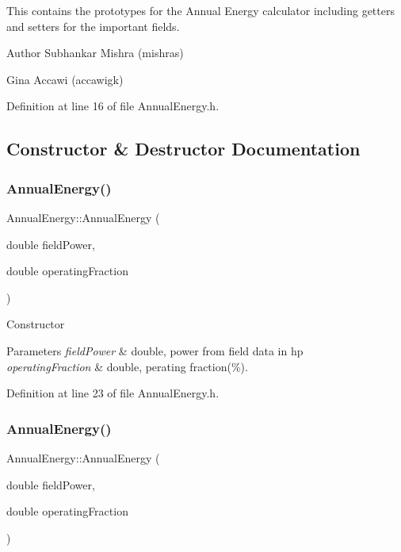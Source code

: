This contains the prototypes for the Annual Energy calculator including getters and setters for the important fields.

\begin{DoxyAuthor}{Author}
Subhankar Mishra (mishras) 

Gina Accawi (accawigk) 
\end{DoxyAuthor}


Definition at line 16 of file Annual\+Energy.\+h.



\subsection{Constructor \& Destructor Documentation}
\mbox{\label{class_annual_energy_a5e446ce85879bafeac8fc992cb5b9ed7}} 
\subsubsection{\texorpdfstring{Annual\+Energy()}{AnnualEnergy()}\hspace{0.1cm}{\footnotesize\ttfamily [1/3]}}
{\footnotesize\ttfamily Annual\+Energy\+::\+Annual\+Energy (\begin{DoxyParamCaption}\item[{double}]{field\+Power,  }\item[{double}]{operating\+Fraction }\end{DoxyParamCaption})\hspace{0.3cm}{\ttfamily [inline]}}

Constructor 
\begin{DoxyParams}{Parameters}
{\em field\+Power} & double, power from field data in hp \\
\hline
{\em operating\+Fraction} & double, perating fraction(\%). \\
\hline
\end{DoxyParams}


Definition at line 23 of file Annual\+Energy.\+h.

\mbox{\label{class_annual_energy_a5e446ce85879bafeac8fc992cb5b9ed7}} 
\subsubsection{\texorpdfstring{Annual\+Energy()}{AnnualEnergy()}\hspace{0.1cm}{\footnotesize\ttfamily [2/3]}}
{\footnotesize\ttfamily Annual\+Energy\+::\+Annual\+Energy (\begin{DoxyParamCaption}\item[{double}]{field\+Power,  }\item[{double}]{operating\+Fraction }\end{DoxyParamCaption})\hspace{0.3cm}{\ttfamily [inline]}}


